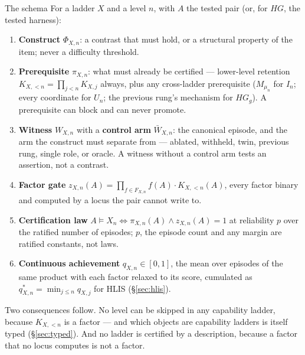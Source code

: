 \begin{claimbox}{The schema}
For a ladder $X$ and a level $n$, with $A$ the tested pair (or, for $HG$, the tested harness):
\begin{enumerate}[leftmargin=*,itemsep=1pt]
\item \textbf{Construct} $\Phi_{X,n}$: a contrast that must hold, or a structural property of the item; never a difficulty threshold.
\item \textbf{Prerequisite} $\pi_{X,n}$: what must already be certified --- lower-level retention $K_{X,<n} = \prod_{j<n} K_{X,j}$ always, plus any cross-ladder prerequisite ($M_{\mu_n}$ for $I_n$; every coordinate for $U_n$; the previous rung's mechanism for $HG_g$). A prerequisite can block and can never promote.
\item \textbf{Witness} $W_{X,n}$ with a \textbf{control arm} $\bar W_{X,n}$: the canonical episode, and the arm the construct must separate from --- ablated, withheld, twin, previous rung, single role, or oracle. A witness without a control arm tests an assertion, not a contrast.
\item \textbf{Factor gate} $z_{X,n}(A) = \prod_{f \in F_{X,n}} f(A) \cdot K_{X,<n}(A)$, every factor binary and computed by a locus the pair cannot write to.
\item \textbf{Certification law} $A \models X_n \iff \pi_{X,n}(A) \wedge z_{X,n}(A) = 1$ at reliability $p$ over the ratified number of episodes; $p$, the episode count and any margin are ratified constants, not laws.
\item \textbf{Continuous achievement} $q_{X,n} \in [0,1]$, the mean over episodes of the same product with each factor relaxed to its score, cumulated as $q^{*}_{X,n} = \min_{j \le n} q_{X,j}$ for HLIS (\S\ref{sec:hlis}).
\end{enumerate}
Two consequences follow. No level can be skipped in any capability ladder, because $K_{X,<n}$ is a factor --- and which objects are capability ladders is itself typed (\S\ref{sec:typed}). And no ladder is certified by a description, because a factor that no locus computes is not a factor.
\end{claimbox}

